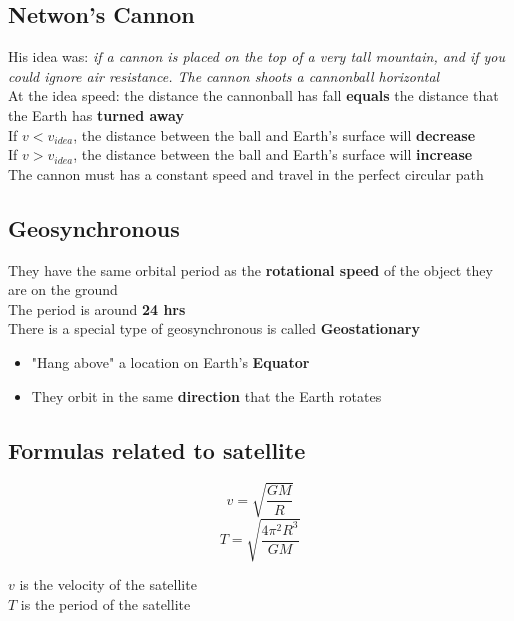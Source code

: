 \subsection{Netwon's Cannon}
His idea was: \textit{if a cannon is placed on the top of a very tall mountain, and if you could ignore air resistance. The cannon 
shoots a cannonball horizontal}\\

At the idea speed: the distance the cannonball has fall \textbf{equals} the distance that the Earth has \textbf{turned away}\\

If $v  < v_{idea}$, the distance between the ball and Earth's surface will \textbf{decrease}\\

If $v  > v_{idea}$, the distance between the ball and Earth's surface will \textbf{increase}\\

The cannon must has a constant speed and travel in the perfect circular path

\subsection{Geosynchronous}
They have the same orbital period as the \textbf{rotational speed} of the object they are on the ground\\

The period is around \textbf{24 hrs}\\

There is a special type of geosynchronous is called \textbf{Geostationary}
\begin{itemize}
    \item "Hang above" a location on Earth's \textbf{Equator}
    \item They orbit in the same \textbf{direction} that the Earth rotates
\end{itemize}

\subsection{Formulas related to satellite}
\begin{equation}
    v = \sqrt{\frac{GM}{R}}
\end{equation}
\begin{equation}
    T = \sqrt{\frac{4 \pi^2 R^3}{GM}}
\end{equation}
\begin{center}
    $v$ is the velocity of the satellite\\
    $T$ is the period of the satellite
\end{center}

